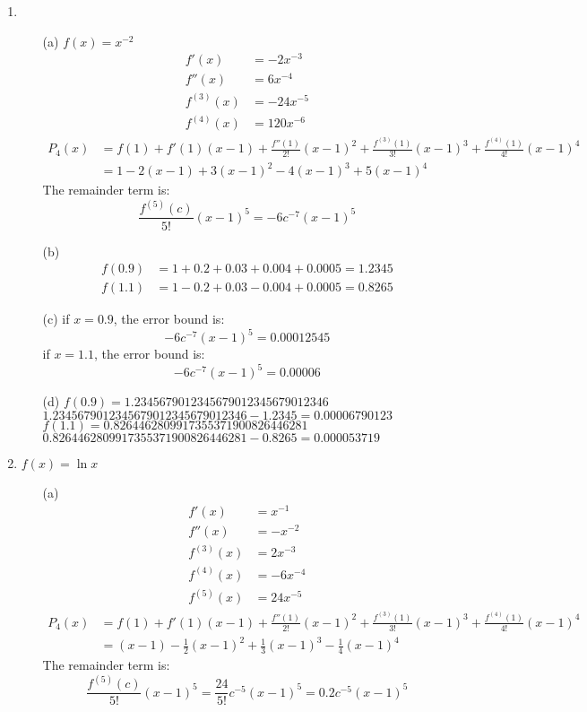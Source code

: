 \documentclass[UTF8]{ctexart}
\begin{document}
\begin{enumerate}
\begin{itemize}
\end{itemize}

\item \begin{itemize}
\item[(a)] $f(x) = x^{-2}$
\begin{align*}
f'(x) &= -2x^{-3} \\
f''(x) &= 6x^{-4} \\
f^{(3)}(x) &= -24x^{-5} \\
f^{(4)}(x) &= 120x^{-6}
\end{align*}
\begin{align*}
P_4(x) &= f(1) + f'(1)(x - 1) + \frac{f''(1)}{2!}(x - 1)^2 + \frac{f^{(3)}(1)}{3!}(x - 1)^3 + \frac{f^{(4)}(1)}{4!}(x - 1)^4 \\
&= 1 - 2(x - 1) + 3(x - 1)^2 - 4(x - 1)^3 + 5(x - 1)^4
\end{align*}
The remainder term is:
\[
	\frac{f^{(5)}(c)}{5!}(x - 1)^5 = -6c^{-7}(x - 1)^5
\]

\item[(b)]
\begin{align*}
f(0.9) &= 1 + 0.2 + 0.03 + 0.004 + 0.0005 = 1.2345 \\
f(1.1) &= 1 - 0.2 + 0.03 - 0.004 + 0.0005 = 0.8265
\end{align*}

\item[(c)]
if $x = 0.9$, the error bound is:
\[
	-6c^{-7}(x - 1)^5 = 0.00012545
\]
if $x = 1.1$, the error bound is:
\[
	-6c^{-7}(x - 1)^5 = 0.00006
\]

\item[(d)] $f(0.9) = 1.2345679012345679012345679012346$\\
$1.2345679012345679012345679012346 - 1.2345 = 0.00006790123$ \\
$f(1.1) = 0.8264462809917355371900826446281$ \\
$0.8264462809917355371900826446281 - 0.8265 = 0.000053719$
\end{itemize}

\item $f(x) = \ln x$
\begin{itemize}
\item[(a)] 
\begin{align*}
f'(x) &= x^{-1} \\
f''(x) &= -x^{-2} \\
f^{(3)}(x) &= 2x^{-3} \\
f^{(4)}(x) &= -6x^{-4} \\
f^{(5)}(x) &= 24x^{-5}
\end{align*}
\begin{align*}
P_4(x) &= f(1) + f'(1)(x - 1) + \frac{f''(1)}{2!}(x - 1)^2 + \frac{f^{(3)}(1)}{3!}(x - 1)^3 + \frac{f^{(4)}(1)}{4!}(x - 1)^4 \\
&= (x - 1) - \frac{1}{2}(x - 1)^2 + \frac{1}{3}(x - 1)^3 - \frac{1}{4}(x - 1)^4
\end{align*}
The remainder term is:
\[
	\frac{f^{(5)}(c)}{5!}(x - 1)^5 = \frac{24}{5!}c^{-5}(x - 1)^5 = 0.2c^{-5}(x - 1)^5
\]


\end{itemize}
\end{enumerate}
\end{document}
